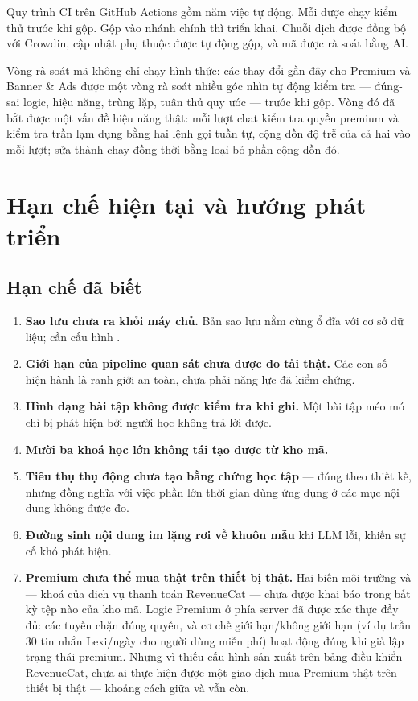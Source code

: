 Quy trình CI trên GitHub Actions gồm năm việc tự động. Mỗi  được chạy
kiểm thử trước khi gộp. Gộp vào nhánh chính thì triển khai. Chuỗi dịch được đồng bộ với
Crowdin, cập nhật phụ thuộc được tự động gộp, và mã được rà soát bằng AI.

Vòng rà soát mã không chỉ chạy hình thức: các thay đổi gần đây cho Premium và Banner \&
Ads được một vòng rà soát nhiều góc nhìn tự động kiểm tra — đúng-sai logic, hiệu năng,
trùng lặp, tuân thủ quy ước — trước khi gộp. Vòng đó đã bắt được một vấn đề hiệu năng
thật: mỗi lượt chat kiểm tra quyền premium và kiểm tra trần lạm dụng bằng hai lệnh gọi
tuần tự, cộng dồn độ trễ của cả hai vào mỗi lượt; sửa thành chạy đồng thời bằng
 loại bỏ phần cộng dồn đó.

\section{Hạn chế hiện tại và hướng phát triển}

\subsection{Hạn chế đã biết}

\begin{enumerate}[leftmargin=1.4em]
  \item \textbf{Sao lưu chưa ra khỏi máy chủ.} Bản sao lưu nằm cùng ổ đĩa với cơ sở dữ
  liệu; cần cấu hình .
  \item \textbf{Giới hạn của pipeline quan sát chưa được đo tải thật.} Các con số hiện
  hành là ranh giới an toàn, chưa phải năng lực đã kiểm chứng.
  \item \textbf{Hình dạng bài tập không được kiểm tra khi ghi.} Một bài tập méo mó chỉ bị
  phát hiện bởi người học không trả lời được.
  \item \textbf{Mười ba khoá học lớn không tái tạo được từ kho mã.}
  \item \textbf{Tiêu thụ thụ động chưa tạo bằng chứng học tập} — đúng theo thiết kế, nhưng
  đồng nghĩa với việc phần lớn thời gian dùng ứng dụng ở các mục nội dung không được đo.
  \item \textbf{Đường sinh nội dung im lặng rơi về khuôn mẫu} khi LLM lỗi, khiến sự cố khó
  phát hiện.
  \item \textbf{Premium chưa thể mua thật trên thiết bị thật.} Hai biến môi trường
   và  — khoá của dịch
  vụ thanh toán RevenueCat — chưa được khai báo trong bất kỳ tệp  nào của kho
  mã. Logic Premium ở phía server đã được xác thực đầy đủ: các tuyến chặn đúng quyền, và cơ
  chế giới hạn/không giới hạn (ví dụ trần 30 tin nhắn Lexi/ngày cho người dùng miễn phí)
  hoạt động đúng khi giả lập trạng thái premium. Nhưng vì thiếu cấu hình sản xuất trên bảng
  điều khiển RevenueCat, chưa ai thực hiện được một giao dịch mua Premium thật trên thiết
  bị thật — khoảng cách giữa  và  vẫn còn.
\end{enumerate}

